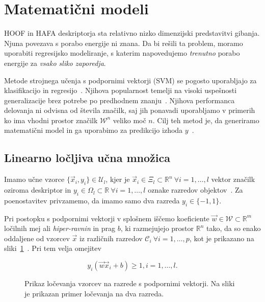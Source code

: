 \section{Matematični modeli}\label{sec:matematicni-modeli}
HOOF in HAFA deskriptorja sta relativno nizko dimenzijski predstavitvi gibanja. Njuna povezava s porabo energije ni znana. Da bi rešili ta problem, moramo uporabiti regresijsko modeliranje, s katerim napovedujemo \emph{trenutno} porabo energije za \emph{vsako sliko zaporedja}.

Metode strojnega učenja s podpornimi vektorji (SVM) se pogosto uporabljajo za klasifikacijo in regresijo~\cite{chang2011a}. Njihova popularnost temelji na visoki uspešnosti generalizacije brez potrebe po predhodnem znanju~\cite{chapelle1999support}. Njihova performanca delovanja ni odvisna od števila značilk, saj jih ponavadi uporabljamo v primerih ko ima vhodni prostor značilk $\mathcal{W}^n$ veliko moč $n$. Cilj teh metod je, da generiramo matematični model in ga uporabimo za predikcijo izhoda $y$~\cite{hsu2003practical}. 






\subsection{Linearno ločljiva učna množica}
Imamo učne vzorce $\{ \vec{x}_i, y_i \} \in \mathcal{U}_l$, kjer je $\vec{x}_i \in \mathcal{\Xi}_l \subset \mathbb{R}^n~\forall i = 1, \ldots, l$ vektor značilk oziroma deskriptor in $y_i \in \mathit{\Omega}_l \subset \mathbb{R}~\forall i = 1, \ldots, l$ oznake razredov objektov~\cite{chapelle1999support}. Za poenostavitev privzamemo, da imamo samo dva razreda $y_i \in \{-1,1\}$. 

Pri postopku s podpornimi vektorji v splošnem iščemo koeficiente \hbox{$\vec{w}\in\mathcal{W}\subset\mathbb{R}^m$} ločilnih mej ali \emph{hiper-ravnin} in prag $b$, ki razmejujejo prostor $\mathbb{R}^n$ tako, da so enako oddaljene od vzorcev $\vec{x}$ iz različnih razredov $\mathcal{C}_i~\forall i= 1, \ldots, p$, kot je prikazano na sliki~\ref{fig:svm-locljivo}~\cite{chapelle1999support}. Pri tem velja omejitev

\begin{equation}\label{eq:omejitev-ravnine}
	y_i(\vec{w} \vec{x}_i + b) \geq 1, i=1, \ldots, l.
\end{equation}





\begin{figure}[htb]
\centering

\caption[Prikaz ločevanja vzorcev na razrede s podpornimi vektorji]{Prikaz ločevanja vzorcev na razrede s podpornimi vektorji. Na sliki je prikazan primer ločevanja na dva razreda.}
\label{fig:svm-locljivo}
\end{figure}




